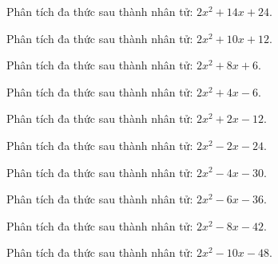 \begin{bt}
	Phân tích đa thức sau thành nhân tử: $2 x^2 + 14 x + 24$.
\end{bt}
\begin{bt}
	Phân tích đa thức sau thành nhân tử: $2 x^2 + 10 x + 12$.
\end{bt}
\begin{bt}
	Phân tích đa thức sau thành nhân tử: $2 x^2 + 8 x + 6$.
\end{bt}
\begin{bt}
	Phân tích đa thức sau thành nhân tử: $2 x^2 + 4 x - 6$.
\end{bt}
\begin{bt}
	Phân tích đa thức sau thành nhân tử: $2 x^2 + 2 x - 12$.
\end{bt}
\begin{bt}
	Phân tích đa thức sau thành nhân tử: $2 x^2 - 2 x - 24$.
\end{bt}
\begin{bt}
	Phân tích đa thức sau thành nhân tử: $2 x^2 - 4 x - 30$.
\end{bt}
\begin{bt}
	Phân tích đa thức sau thành nhân tử: $2 x^2 - 6 x - 36$.
\end{bt}
\begin{bt}
	Phân tích đa thức sau thành nhân tử: $2 x^2 - 8 x - 42$.
\end{bt}
\begin{bt}
	Phân tích đa thức sau thành nhân tử: $2 x^2 - 10 x - 48$.
\end{bt}
